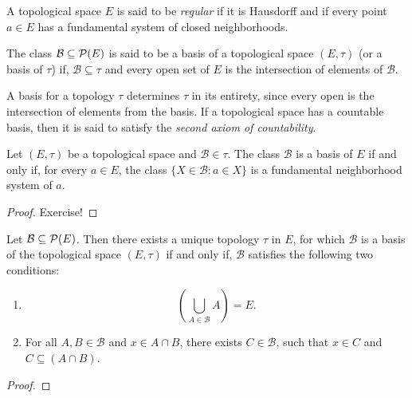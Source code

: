 \begin{definition}
	A topological space $E$ is said to be \emph{regular} if it is Hausdorff and if every point $a \in E$ has a fundamental system of closed neighborhoods.
\end{definition}

\begin{definition}
	The class $\mathcal{B} \subseteq \mathcal{P}(E)$ is said to be a basis of a topological space $(E,\tau)$ (or a basis of $\tau$) if, $\mathcal{B} \subseteq \tau$ and every open set of $E$ is the intersection of elements of $\mathcal{B}$.
\end{definition}

\begin{remark}
	A basis for a topology $\tau$ determines $\tau$ in its entirety, since every open is the intersection of elements from the basis. If a topological space has a countable basis, then it is said to satisfy the \emph{second axiom of countability}.
\end{remark}

\begin{theorem}
	Let $(E, \tau)$ be a topological space and $\mathcal{B} \in \tau$. The class $\mathcal{B}$ is a basis of $E$ if and only if, for every $a \in E$, the class $\{X \in \mathcal{B}: a \in X \}$ is a fundamental neighborhood system of $a$.
\end{theorem}
\begin{proof}
Exercise!	
\end{proof}

\begin{theorem}
	Let $\mathcal{B} \subseteq \mathcal{P}(E)$. Then there exists a unique topology $\tau$ in $E$, for which $\mathcal{B}$ is a basis of the topological space $(E, \tau)$ if and only if, $\mathcal{B}$ satisfies the following two conditions:
	\begin{enumerate}
		\item
			\begin{equation*}
				\left ( \bigcup_{A \in \mathcal{B}} A \right )  = E.
			\end{equation*}
		\item
			For all $A,B \in \mathcal{B}$ and $x \in A \cap B$, there exists $C \in \mathcal{B}$, such that $x \in C$ and $C \subseteq (A \cap B)$.
	\end{enumerate}
	
\end{theorem}
\begin{proof}
\end{proof}


